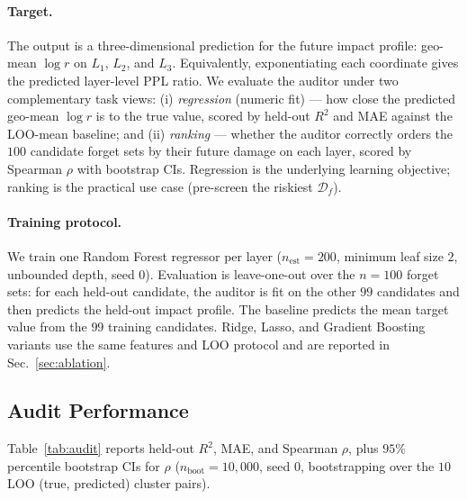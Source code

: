 \documentclass[11pt]{article}
\newcommand{\Df}{\mathcal{D}_f}
\newcommand{\Lone}{L_1}
\newcommand{\Ltwo}{L_2}
\newcommand{\Lthree}{L_3}
\begin{document}
\paragraph{Target.} The output is a three-dimensional prediction for the
future impact profile: geo-mean $\log r$ on $\Lone$, $\Ltwo$, and $\Lthree$.
Equivalently, exponentiating each coordinate gives the predicted layer-level
PPL ratio. We evaluate the auditor under two complementary task views:
(i) \emph{regression} (numeric fit) --- how close the predicted geo-mean $\log r$
is to the true value, scored by held-out $R^2$ and MAE against the LOO-mean
baseline; and (ii) \emph{ranking} --- whether the auditor correctly orders the
$100$ candidate forget sets by their future damage on each layer, scored by
Spearman $\rho$ with bootstrap CIs. Regression is the underlying learning
objective; ranking is the practical use case (pre-screen the riskiest $\Df$).

\paragraph{Training protocol.} We train one Random Forest regressor per layer
($n_{\text{est}}{=}200$, minimum leaf size $2$, unbounded depth, seed $0$).
Evaluation is leave-one-out over the $n{=}100$ forget sets: for each held-out
candidate, the auditor is fit on the other $99$ candidates and then predicts
the held-out impact profile. The baseline predicts the mean target value from
the $99$ training candidates. Ridge, Lasso, and Gradient Boosting variants use
the same features and LOO protocol and are reported in Sec.~\ref{sec:ablation}.

\subsection{Audit Performance}
\label{sec:audit-perf}

Table~\ref{tab:audit} reports held-out $R^2$, MAE, and Spearman $\rho$, plus $95\%$ percentile bootstrap CIs for $\rho$ ($n_{\text{boot}}{=}10{,}000$, seed $0$, bootstrapping over the $10$ LOO (true, predicted) cluster pairs).
\end{document}
